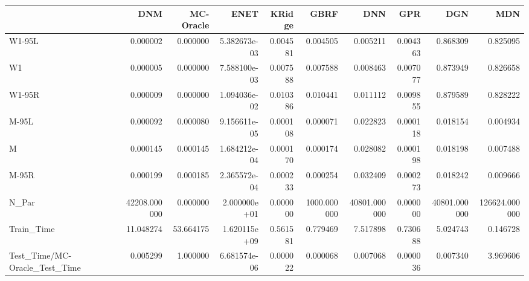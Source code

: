 \begin{tabular}{lrrrrrrrrr}
\toprule
{} &           DNM &  MC-Oracle &          ENET &    KRidge &         GBRF &           DNN &       GPR &           DGN &            MDN \\
\midrule
W1-95L                        &      0.000002 &   0.000000 &  5.382673e-03 &  0.004581 &     0.004505 &      0.005211 &  0.004363 &      0.868309 &       0.825095 \\
W1                            &      0.000005 &   0.000000 &  7.588100e-03 &  0.007588 &     0.007588 &      0.008463 &  0.007077 &      0.873949 &       0.826658 \\
W1-95R                        &      0.000009 &   0.000000 &  1.094036e-02 &  0.010386 &     0.010441 &      0.011112 &  0.009855 &      0.879589 &       0.828222 \\
M-95L                         &      0.000092 &   0.000080 &  9.156611e-05 &  0.000108 &     0.000071 &      0.022823 &  0.000118 &      0.018154 &       0.004934 \\
M                             &      0.000145 &   0.000145 &  1.684212e-04 &  0.000170 &     0.000174 &      0.028082 &  0.000198 &      0.018198 &       0.007488 \\
M-95R                         &      0.000199 &   0.000185 &  2.365572e-04 &  0.000233 &     0.000254 &      0.032409 &  0.000273 &      0.018242 &       0.009666 \\
N\_Par                         &  42208.000000 &   0.000000 &  2.000000e+01 &  0.000000 &  1000.000000 &  40801.000000 &  0.000000 &  40801.000000 &  126624.000000 \\
Train\_Time                    &     11.048274 &  53.664175 &  1.620115e+09 &  0.561581 &     0.779469 &      7.517898 &  0.730688 &      5.024743 &       0.146728 \\
Test\_Time/MC-Oracle\_Test\_Time &      0.005299 &   1.000000 &  6.681574e-06 &  0.000022 &     0.000068 &      0.007068 &  0.000036 &      0.007340 &       3.969606 \\
\bottomrule
\end{tabular}
